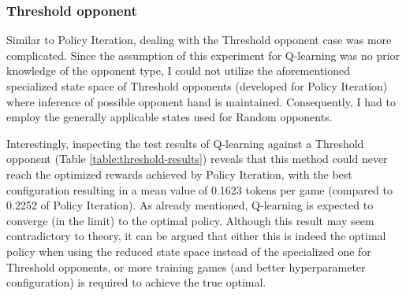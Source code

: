 \subsubsection{Threshold opponent}

Similar to Policy Iteration, dealing with the Threshold opponent case was more complicated. Since the assumption of this experiment for Q-learning was no prior knowledge of the opponent type, I could not utilize the aforementioned specialized state space of Threshold opponents (developed for Policy Iteration) where inference of possible opponent hand is maintained. Consequently, I had to employ the generally applicable states used for Random opponents.

Interestingly, inspecting the test results of Q-learning against a Threshold opponent (Table \ref{table:threshold-results}) reveals that this method could never reach the optimized rewards achieved by Policy Iteration, with the best configuration resulting in a mean value of 0.1623 tokens per game (compared to 0.2252 of Policy Iteration). As already mentioned, Q-learning is expected to converge (in the limit) to the optimal policy. Although this result may seem contradictory to theory, it can be argued that either this is indeed the optimal policy when using the reduced state space instead of the specialized one for Threshold opponents, or more training games (and better hyperparameter configuration) is required to achieve the true optimal.

\begin{table}[htpb]
\centering
{}
\caption{Testing performance of various agents against Threshold agent. All experiments consisted of a total number of $5\cdot10^6$ games.}
\label{table:threshold-results}
\end{table}


